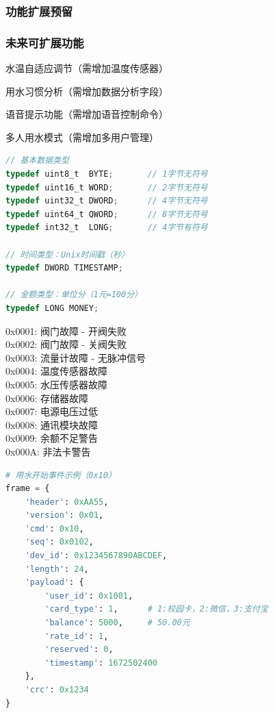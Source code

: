 \documentclass{wlwtxjsccp}
\begin{document}
\subsubsection{功能扩展预留}

\subsubsection{未来可扩展功能}
\noindent 水温自适应调节（需增加温度传感器）\par
\noindent 用水习惯分析（需增加数据分析字段）\par
\noindent 语音提示功能（需增加语音控制命令）\par
\noindent 多人用水模式（需增加多用户管理）\par


\begin{lstlisting}[language=C]
// 基本数据类型
typedef uint8_t  BYTE;       // 1字节无符号
typedef uint16_t WORD;       // 2字节无符号
typedef uint32_t DWORD;      // 4字节无符号
typedef uint64_t QWORD;      // 8字节无符号
typedef int32_t  LONG;       // 4字节有符号

// 时间类型：Unix时间戳（秒）
typedef DWORD TIMESTAMP;

// 金额类型：单位分（1元=100分）
typedef LONG MONEY;
\end{lstlisting}

\noindent 0x0001: 阀门故障 - 开阀失败\\
0x0002: 阀门故障 - 关阀失败\\
0x0003: 流量计故障 - 无脉冲信号\\
0x0004: 温度传感器故障\\
0x0005: 水压传感器故障\\
0x0006: 存储器故障\\
0x0007: 电源电压过低\\
0x0008: 通讯模块故障\\
0x0009: 余额不足警告\\
0x000A: 非法卡警告\par

\begin{lstlisting}[language=Python]
# 用水开始事件示例（0x10）
frame = {
    'header': 0xAA55,
    'version': 0x01,
    'cmd': 0x10,
    'seq': 0x0102,
    'dev_id': 0x1234567890ABCDEF,
    'length': 24,
    'payload': {
        'user_id': 0x1001,
        'card_type': 1,      # 1:校园卡，2:微信，3:支付宝
        'balance': 5000,     # 50.00元
        'rate_id': 1,
        'reserved': 0,
        'timestamp': 1672502400
    },
    'crc': 0x1234
}
\end{lstlisting}
\end{document}

